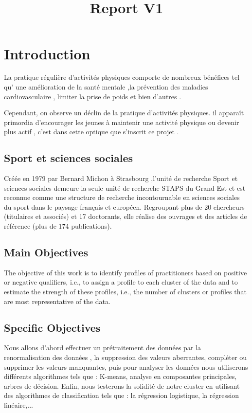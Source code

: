 \documentclass[12pt]{article}
\title{Report V1}
\begin{document}
    \maketitle

\tableofcontents

\section{Introduction}
La pratique régulière d’activités physiques comporte de nombreux bénéfices tel 
qu' une amélioration de la santé mentale ,la prévention des maladies cardiovasculaire , limiter la prise  de poids et bien d'autres . 

Cependant, on observe un déclin de la pratique d’activités physiques.
il apparaît primordia d’encourager les jeunes à maintenir une activité physique ou devenir plus actif , c'est dans cette optique que s'inscrit ce projet . 



\subsection{Sport et sciences sociales}

Créée en 1979 par Bernard Michon à Strasbourg ,l’unité de recherche Sport et sciences sociales
demeure la seule unité de recherche STAPS du Grand Est et est reconnue comme une structure de recherche incontournable  en sciences sociales du sport dans le paysage français et européen.
Regroupant plus de 20 chercheurs (titulaires et associés) et 17 doctorants, elle réalise  des	ouvrages	et	des	articles de	référence (plus	de	174	publications).



\subsection{Main Objectives}

The objective of this work is to identify profiles of practitioners based on positive or negative qualifiers, i.e., to assign a profile to each cluster of the data and to estimate the strength of these profiles, i.e., the number of clusters or profiles that are most representative of the data.


\subsection{Specific Objectives}
Nous allons d'abord effectuer un prétraitement des données par la renormalisation des données , la suppression des valeurs aberrantes,  compléter ou  supprimer les valeurs manquantes, puis pour analyser les données nous utiliserons différents algorithmes tels que : K-means, analyse en composantes principales, arbres de décision. Enfin, nous testerons la solidité de notre cluster en utilisant des algorithmes de classification tels que : la régression logistique, la régression linéaire,...
\end{document}
